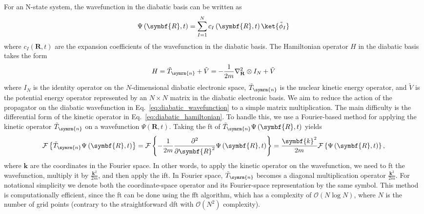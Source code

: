 For an N-state system, the wavefunction in the diabatic basis can be written as
\begin{equation}\label{eq:diabatic_wavefunction}
\Psi\left(\symbf{R},t\right)=\sum_{I=1}^N c_I\left(\symbf{R},t\right)\ket{\tilde\phi_I}
\end{equation}
where $c_I\left(\symbf{R},t\right)$ are the expansion coefficients of the wavefunction in the diabatic basis. The Hamiltonian operator $H$ in the diabatic basis takes the form
\begin{equation}\label{eq:diabatic_hamiltonian}
H=\tilde{T}_{\symrm{n}}+\tilde{V}=-\frac{1}{2m}\nabla_\mathbf{R}^2\otimes I_N+\tilde{V}
\end{equation}
where $I_N$ is the identity operator on the $N$-dimensional diabatic electronic space,
$\tilde{T}_{\symrm{n}}$ is the nuclear kinetic energy operator, and $\tilde{V}$ is the
potential energy operator represented by an $N\times N$ matrix in the diabatic electronic basis. We aim to reduce the action of the propagator on the diabatic wavefunction in Eq.~\eqref{eq:diabatic_wavefunction} to a simple matrix multiplication. The main difficulty is the differential form of the kinetic operator in Eq.~\eqref{eq:diabatic_hamiltonian}. To handle this, we use a Fourier-based method for applying the kinetic operator $\tilde{T}_{\symrm{n}}$ on a wavefunction $\Psi\left(\symbf{R},t\right)$. Taking the \acrfull{ft} of $\tilde{T}_{\symrm{n}}\Psi\left(\symbf{R},t\right)$ yields
\begin{equation}\label{eq:kinetic_fourier_method}
\mathcal{F}\left\lbrace \tilde{T}_{\symrm{n}}\Psi\left(\symbf{R},t\right)\right\rbrace=\mathcal{F}\left\lbrace-\frac{1}{2m}\frac{\partial^2}{\partial\symbf{R}^2}\Psi\left(\symbf{R},t\right)\right\rbrace=\frac{\symbf{k}^2}{2m}\mathcal{F}\left\lbrace\Psi\left(\symbf{R},t\right)\right\rbrace,
\end{equation}
where $\symbf{k}$ are the coordinates in the Fourier space. In other words, to apply the kinetic operator on the wavefunction, we need to \acrshort{ft} the wavefunction, multiply it by $\frac{\symbf{k}^2}{2m}$, and then apply the \acrfull{ift}. In Fourier space, $\tilde{T}_{\symrm{n}}$ becomes a diagonal multiplication operator $\frac{\symbf{k}^2}{2m}$. For notational simplicity we denote both the coordinate-space operator and its Fourier-space representation by the same symbol. This method is computationally efficient, since the \acrshort{ft} can be done using the \acrfull{fft} algorithm, which has a complexity of $\mathcal{O}(N\log N)$, where $N$ is the number of grid points (contrary to the straightforward \acrfull{dft} with $\mathcal{O}(N^2)$ complexity).

